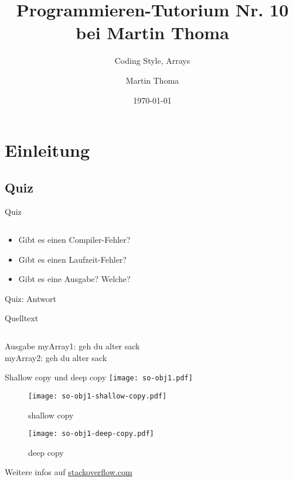 \documentclass[usepdftitle=false,hyperref={pdfpagelabels=false}]{beamer}
\institute{Fakultät für Informatik}
\newcommand\tutor{Martin Thoma}
\newcommand\tutNR{10}
\newcommand\titleText{Programmieren-Tutorium Nr. \tutNR{} bei \tutor}
\begin{document}
\title{\titleText}
\subtitle{Coding Style, Arrays}
\author{\tutor}
\date{\today}
\subject{Programmieren}

\frame{\titlepage}


\section{Einleitung}
\subsection{Quiz}
\begin{frame}{Quiz}
    \inputminted[linenos=true, numbersep=5pt, tabsize=4, fontsize=\small, label=QuizArray.java, frame=lines]{java}{QuizArray.java}
    \begin{itemize}
        \item Gibt es einen Compiler-Fehler?
        \item Gibt es einen Laufzeit-Fehler?
        \item Gibt es eine Ausgabe? Welche?
    \end{itemize}
\end{frame}

\begin{frame}{Quiz: Antwort}
    \begin{block}{Quelltext}
        \inputminted[linenos=true, numbersep=5pt, tabsize=4, fontsize=\tiny]{java}{QuizArray.java}
    \end{block}

    \begin{block}{Ausgabe}
        myArray1:  geh  du alter sack\\
        myArray2:  geh  du alter sack 
    \end{block}
\end{frame}

\begin{frame}{Shallow copy und deep copy}
    \texttt{[image: so-obj1.pdf]}

    \begin{minipage}[b]{0.45\linewidth}
    \begin{figure}[htb]
        \texttt{[image: so-obj1-shallow-copy.pdf]}
        \caption{shallow copy}
        \label{UploadForm}
    \end{figure}
    \end{minipage}
    \hspace{0.5cm}
    \begin{minipage}[b]{0.45\linewidth}
    \begin{figure}[htb]
        \texttt{[image: so-obj1-deep-copy.pdf]}
        \caption{deep copy}
        \label{UploadForm}
    \end{figure}
    \end{minipage}

    \tiny{Weitere infos auf \href{http://stackoverflow.com/a/9835954/562769}{stackoverflow.com}}
\end{frame}
\end{document}
